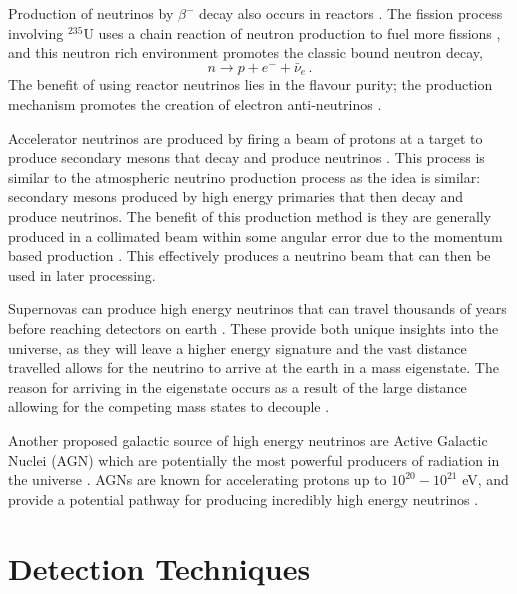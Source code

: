 Production of neutrinos by $\beta^{-}$ decay also occurs in reactors \cite{re_nu}. The fission process involving $^{235}$U uses a chain reaction of neutron production to fuel more fissions \cite{re_nu}, and this neutron rich environment promotes the classic bound neutron decay,
\begin{equation}
  n \to p + e^{-} + \bar{\nu}_{e}\, .
\end{equation}
The benefit of using reactor neutrinos lies in the flavour purity; the production mechanism promotes the creation of electron anti-neutrinos \cite{re_nu}.

Accelerator neutrinos are produced by firing a beam of protons at a target to produce secondary mesons that decay and produce neutrinos \cite{acc_nu}. This process is similar to the atmospheric neutrino production process as the idea is similar: secondary mesons produced by high energy primaries that then decay and produce neutrinos. The benefit of this production method is they are generally produced in a collimated beam within some angular error due to the momentum based production \cite{acc_nu}. This effectively produces a neutrino beam that can then be used in later processing.

Supernovas can produce high energy neutrinos that can travel thousands of years before reaching detectors on earth \cite{sup_nu}. These provide both unique insights into the universe, as they will leave a higher energy signature \cite{sup_nu} and the vast distance travelled allows for the neutrino to arrive at the earth in a mass eigenstate. The reason for arriving in the eigenstate occurs as a result of the large distance allowing for the competing mass states to decouple \cite{sup_nu}. 

Another proposed galactic source of high energy neutrinos are Active Galactic Nuclei (AGN) which are potentially the most powerful producers of radiation in the universe \cite{agn_nu}. AGNs are known for accelerating protons up to $10^{20} - 10^{21}$ eV, and provide a potential pathway for producing incredibly high energy neutrinos \cite{agn_nu}.

\section{Detection Techniques}

